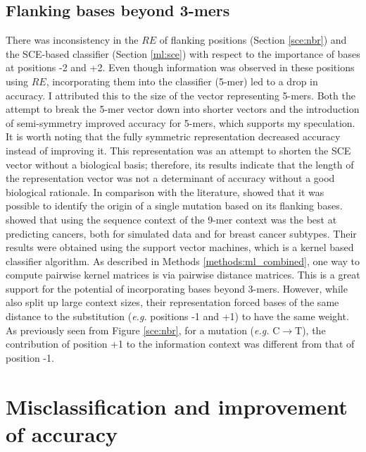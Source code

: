 \subsection{Flanking bases beyond 3-mers}
There was inconsistency in the $RE$ of flanking positions (Section \ref{sce:nbr}) and the SCE-based classifier (Section \ref{ml:sce}) with respect to the importance of bases at positions -2 and +2. Even though information was observed in these positions using $RE$, incorporating them into the classifier (5-mer) led to a drop in accuracy. I attributed this to the size of the vector representing 5-mers. Both the attempt to break the 5-mer vector down into shorter vectors and the introduction of semi-symmetry improved accuracy for 5-mers, which supports my speculation. It is worth noting that the fully symmetric representation decreased accuracy instead of improving it. This representation was an attempt to shorten the SCE vector without a biological basis; therefore, its results indicate that the length of the representation vector was not a determinant of accuracy without a good biological rationale. In comparison with the literature, \citet{Zhu2020} showed that it was possible to identify the origin of a single mutation based on its flanking bases. \citep{Zhang2020} showed that using the sequence context of the 9-mer context was the best at predicting cancers, both for simulated data and for breast cancer subtypes. Their results were obtained using the support vector machines, which is a kernel based classifier algorithm. As described in Methods \ref{methods:ml_combined}, one way to compute pairwise kernel matrices is via pairwise distance matrices.  This is a great support for the potential of incorporating bases beyond 3-mers. However, while \citet{Zhang2020} also split up large context sizes, their representation forced bases of the same distance to the substitution (\textit{e.g.} positions -1 and +1) to have the same weight. As previously seen from Figure \ref{sce:nbr}, for a mutation (\textit{e.g.} C$\rightarrow$T), the contribution of position +1 to the information context was different from that of position -1.

\section{Misclassification and improvement of accuracy}
